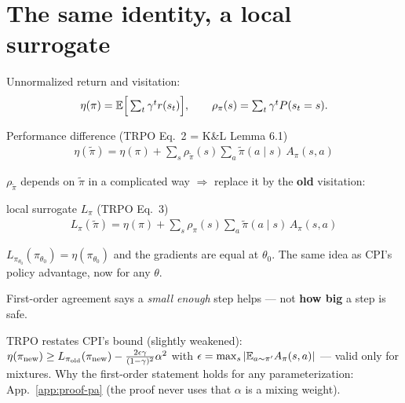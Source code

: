 \section{The same identity, a local surrogate}

Unnormalized return and visitation:
\begin{gather*}
  \eta(\pi)=\mathbb{E}\Big[\textstyle\sum_t\gamma^t r(s_t)\Big], \qquad \rho_\pi(s)=\textstyle\sum_t\gamma^t P(s_t=s).
\end{gather*}

\begin{thmbox}{Performance difference (TRPO Eq.~2 = K\&L Lemma 6.1)}
\begin{gather*}
  \eta(\tilde\pi) = \eta(\pi) + \sum_s \rho_{\tilde\pi}(s) \sum_a \tilde\pi(a\mid s)\, A_\pi(s,a)
\end{gather*}
\end{thmbox}

$\rho_{\tilde\pi}$ depends on $\tilde\pi$ in a complicated way $\Rightarrow$ replace it by the \textbf{old} visitation:

\begin{defbox}{local surrogate $L_\pi$ (TRPO Eq.~3)}
\begin{gather*}
  L_\pi(\tilde\pi) = \eta(\pi) + \sum_s \rho_{\pi}(s) \sum_a \tilde\pi(a\mid s)\, A_\pi(s,a)
\end{gather*}
\end{defbox}

\begin{pair}
\begin{keybox}[title={Matches $\eta$ to first order}]
$L_{\pi_{\theta_0}}(\pi_{\theta_0}) = \eta(\pi_{\theta_0})$ and the gradients are equal at $\theta_0$. The same idea as CPI's policy advantage, now for any $\theta$.
\end{keybox}
\begin{warnbox}[title={Says nothing about step size}]
First-order agreement says a \emph{small enough} step helps --- not \textbf{how big} a step is safe.
\end{warnbox}
\end{pair}

\begin{notebox}
TRPO restates CPI's bound (slightly weakened): $\eta(\pi_{\mathrm{new}})\ge L_{\pi_{\mathrm{old}}}(\pi_{\mathrm{new}})-\frac{2\epsilon\gamma}{(1-\gamma)^2}\alpha^2$ with $\epsilon=\max_s|\mathbb{E}_{a\sim\pi'}A_\pi(s,a)|$ --- valid only for mixtures. Why the first-order statement holds for any parameterization: App.~\ref{app:proof-pa} (the proof never uses that $\alpha$ is a mixing weight).
\end{notebox}

